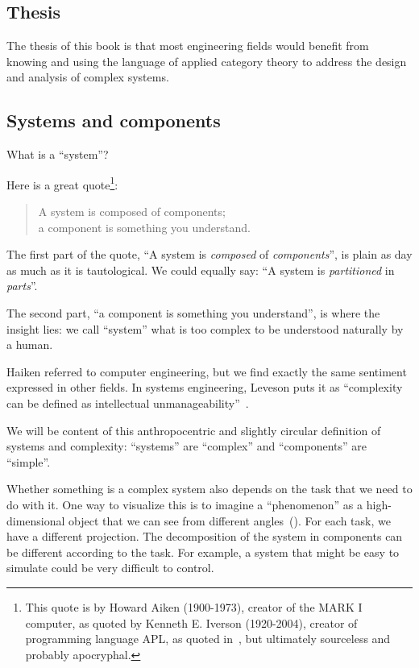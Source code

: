 
\subsection{Thesis}

The thesis of this book is that most engineering fields would benefit 
from knowing and using the language of applied category theory to
address the design and analysis of complex systems.


\subsection{Systems and components}
\label{sec:systems-and-components}

What is a ``system''?

Here is a great quote\footnote{
    This quote is by Howard Aiken (1900-1973), creator of the MARK I computer,
    as quoted by Kenneth E. Iverson (1920-2004), creator of programming language APL,
    as quoted in~\cite{McIntyre1999Role}, but ultimately sourceless and probably apocryphal.
}:

\begin{quote}
    A system is composed of components;  \\
    a component is something you understand.
\end{quote}
 
The first part of the quote, ``A system is \emph{composed} of \emph{components}'', is plain as day as much as it is tautological. We could equally say: ``A system is \emph{partitioned} in \emph{parts}''.

The second part, ``a component is something you understand'', is where the insight lies: we call ``system'' what is too complex to be understood naturally by a human.

Haiken referred to computer engineering, but we find exactly the same sentiment expressed in other fields. In systems engineering, Leveson puts it as ``complexity can be defined as intellectual unmanageability''~\cite{leveson12engineering}.

We will be content of this anthropocentric and slightly circular definition of systems and
complexity: ``systems'' are ``complex'' and ``components'' are ``simple''.

Whether something is a complex system also depends on the task that we need to do with it. One
way to visualize this is to imagine a ``phenomenon'' as a high-dimensional object that we can see
from different angles~(). For each task, we have a different
projection. The decomposition of the system in components can be different according to the
task. For example, a system that might be easy to simulate could be very difficult to control.

